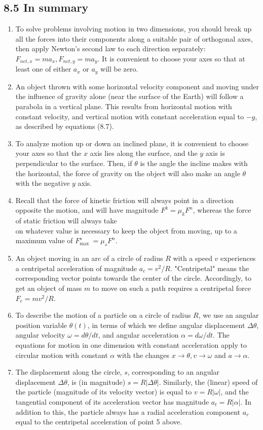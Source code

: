 \documentclass[10pt]{article}
\begin{document}
\subsection*{8.5 In summary}
\begin{enumerate}
  \item To solve problems involving motion in two dimensions, you should break up all the forces into their components along a suitable pair of orthogonal axes, then apply Newton's second law to each direction separately: $F_{n e t, x}=m a_{x}, F_{n e t, y}=m a_{y}$. It is convenient to choose your axes so that at least one of either $a_{x}$ or $a_{y}$ will be zero.
  \item An object thrown with some horizontal velocity component and moving under the influence of gravity alone (near the surface of the Earth) will follow a parabola in a vertical plane. This results from horizontal motion with constant velocity, and vertical motion with constant acceleration equal to $-g$, as described by equations (8.7).
  \item To analyze motion up or down an inclined plane, it is convenient to choose your axes so that the $x$ axis lies along the surface, and the $y$ axis is perpendicular to the surface. Then, if $\theta$ is the angle the incline makes with the horizontal, the force of gravity on the object will also make an angle $\theta$ with the negative $y$ axis.
  \item Recall that the force of kinetic friction will always point in a direction opposite the motion, and will have magnitude $F^{k}=\mu_{k} F^{n}$, whereas the force of static friction will always take\\
on whatever value is necessary to keep the object from moving, up to a maximum value of $F_{\text {max }}^{s}=\mu_{s} F^{n}$.
  \item An object moving in an arc of a circle of radius $R$ with a speed $v$ experiences a centripetal acceleration of magnitude $a_{c}=v^{2} / R$. "Centripetal" means the corresponding vector points towards the center of the circle. Accordingly, to get an object of mass $m$ to move on such a path requires a centripetal force $F_{c}=m v^{2} / R$.
  \item To describe the motion of a particle on a circle of radius $R$, we use an angular position variable $\theta(t)$, in terms of which we define angular displacement $\Delta \theta$, angular velocity $\omega=d \theta / d t$, and angular acceleration $\alpha=d \omega / d t$. The equations for motion in one dimension with constant acceleration apply to circular motion with constant $\alpha$ with the changes $x \rightarrow \theta, v \rightarrow \omega$ and $a \rightarrow \alpha$.
  \item The displacement along the circle, $s$, corresponding to an angular displacement $\Delta \theta$, is (in magnitude) $s=R|\Delta \theta|$. Similarly, the (linear) speed of the particle (magnitude of its velocity vector) is equal to $v=R|\omega|$, and the tangential component of its acceleration vector has magnitude $a_{t}=R|\alpha|$. In addition to this, the particle always has a radial acceleration component $a_{r}$ equal to the centripetal acceleration of point 5 above.
\end{enumerate}
\end{document}
